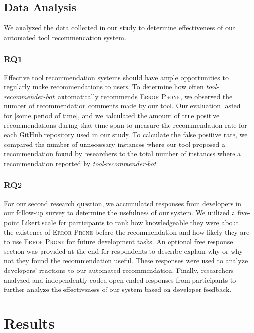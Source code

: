 \documentclass[sigconf,review,anonymous]{acmart}
\newcommand{\tool}{\textsl{tool-recommender-bot}}
\begin{document}
\subsection{Data Analysis}

We analyzed the data collected in our study to determine effectiveness of our automated tool recommendation system.

\subsubsection{RQ1}

Effective tool recommendation systems should have ample opportunities to regularly make recommendations to users. To determine how often \tool~automatically recommends \textsc{Error Prone}, we observed the number of recommendation comments made by our tool. Our evaluation lasted for [some period of time], and we calculated the amount of true positive recommendations during that time span to measure the recommendation rate for each GitHub repository used in our study. To calculate the false positive rate, we compared the number of unnecessary instances where our tool proposed a recommendation found by researchers to the total number of instances where a recommendation reported by \tool.

\subsubsection{RQ2}

For our second research question, we accumulated responses from developers in our follow-up survey to determine the usefulness of our system. We utilized a five-point Likert scale for participants to rank how knowledgeable they were about the existence of \textsc{Error Prone} before the recommendation and how likely they are to use \textsc{Error Prone} for future development tasks. An optional free response section was provided at the end for respondents to describe explain why or why not they found the recommendation useful. These responses were used to analyze developers' reactions to our automated recommendation. Finally, researchers analyzed and independently coded open-ended responses from participants to further analyze the effectiveness of our system based on developer feedback.

\section{Results}
\end{document}
